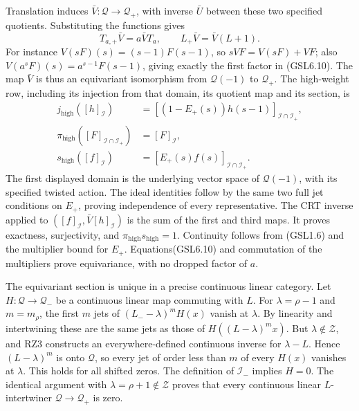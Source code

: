 Translation induces \(\bar V:\mathcal Q\to\mathcal Q_+\), with inverse
\(\bar U\) between these two specified quotients. Substituting the
functions gives \[
T_{a,+}\bar V=a\bar VT_a,
\qquad L_+\bar V=\bar V(L+1).
\tag{GSL6.10}
\] For instance \(V(sF)(s)=(s-1)F(s-1)\), so \(sVF=V(sF)+VF\); also
\(V(a^sF)(s)=a^{s-1}F(s-1)\), giving exactly the first factor in
(GSL6.10). The map \(\bar V\) is thus an equivariant isomorphism from
\(\mathcal Q(-1)\) to \(\mathcal Q_+\). The high-weight row, including
its injection from that domain, its quotient map and its section, is \[
\begin{aligned}
j_{\mathrm{high}}([h]_{\mathcal I})
 &=[(1-E_+(s))h(s-1)]_{\mathcal I\cap\mathcal I_+},\\
\pi_{\mathrm{high}}([F]_{\mathcal I\cap\mathcal I_+})
 &=[F]_{\mathcal I},\\
s_{\mathrm{high}}([f]_{\mathcal I})
 &=[E_+(s)f(s)]_{\mathcal I\cap\mathcal I_+}.
\end{aligned}
\tag{GSL6.11}
\] The first displayed domain is the underlying vector space of
\(\mathcal Q(-1)\), with its specified twisted action. The ideal
identities follow by the same two full jet conditions on \(E_+\),
proving independence of every representative. The CRT inverse applied to
\(([f]_{\mathcal I},\bar V[h]_{\mathcal I})\) is the sum of the first
and third maps. It proves exactness, surjectivity, and
\(\pi_{\mathrm{high}}s_{\mathrm{high}}=1\). Continuity follows from
(GSL1.6) and the multiplier bound for \(E_+\). Equations(GSL6.10) and
commutation of the multipliers prove equivariance, with no dropped
factor of \(a\).

The equivariant section is unique in a precise continuous linear
category. Let \(H:\mathcal Q\to\mathcal Q_-\) be a continuous linear map
commuting with \(L\). For \(\lambda=\rho-1\) and \(m=m_\rho\), the first
\(m\) jets of \((L_--\lambda)^mH(x)\) vanish at \(\lambda\). By
linearity and intertwining these are the same jets as those of
\(H((L-\lambda)^mx)\). But \(\lambda\notin\mathscr Z\), and RZ3
constructs an everywhere-defined continuous inverse for \(\lambda-L\).
Hence \((L-\lambda)^m\) is onto \(\mathcal Q\), so every jet of order
less than \(m\) of every \(H(x)\) vanishes at \(\lambda\). This holds
for all shifted zeros. The definition of \(\mathcal I_-\) implies
\(H=0\). The identical argument with \(\lambda=\rho+1\notin\mathscr Z\)
proves that every continuous linear \(L\)-intertwiner
\(\mathcal Q\to\mathcal Q_+\) is zero.

